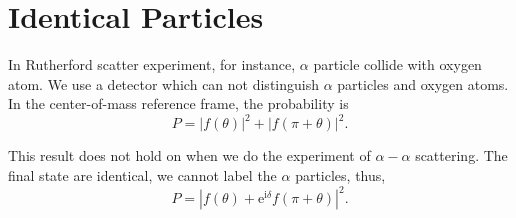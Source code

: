 \section[全同粒子]{Identical Particles}
In Rutherford scatter experiment, for instance, $\alpha$ particle collide with oxygen atom. We use a detector which can not distinguish $\alpha$ particles and oxygen atoms. In the center-of-mass reference frame, the probability is
\begin{equation}
  P = |f(\theta)|^2 + |f(\pi +\theta)|^2.
\end{equation}

This result does not hold on when we do the experiment of $\alpha-\alpha$ scattering. The final state are identical, we cannot label the $\alpha$ particles, thus,
\begin{equation}
  P = \left| f(\theta) + \mathrm{e}^{\mathrm{i} \delta} f(\pi + \theta) \right| ^2.
\end{equation}
